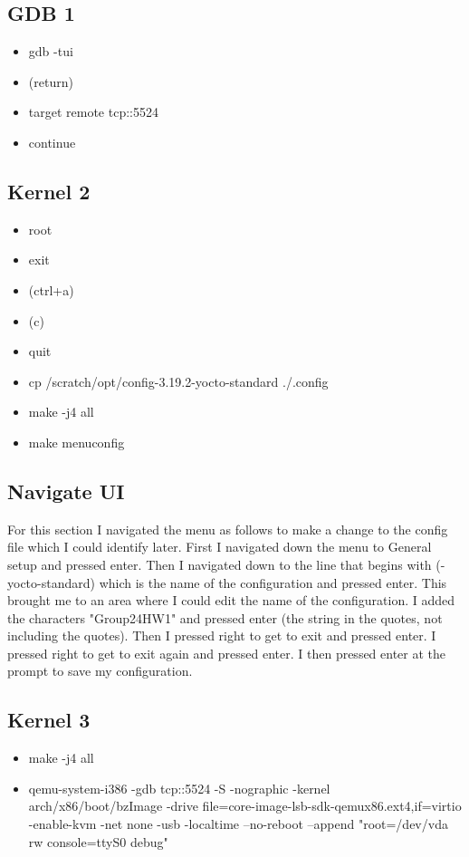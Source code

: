 \documentclass[onecolumn, draftclsnofoot,10pt, compsoc]{IEEEtran}
\begin{document}
    \subsection{GDB 1}
        \begin{itemize}
            \item gdb -tui
            \item (return)
            \item target remote tcp::5524
            \item continue
        \end{itemize}

    \subsection{Kernel 2}
        \begin{itemize}
            \item root
            \item exit
            \item(ctrl+a)
            \item(c)
            \item quit
            \item cp /scratch/opt/config-3.19.2-yocto-standard ./.config
            \item make -j4 all
            \item make menuconfig
        \end{itemize}


    \subsection{Navigate UI}
    For this section I navigated the menu as follows to make a change to the config file which I could identify later. First I navigated down the menu to General setup and pressed enter. Then I navigated down to the line that begins with (-yocto-standard) which is the name of the configuration and pressed enter. This brought me to an area where I could edit the name of the configuration. I added the characters "Group24HW1" and pressed enter (the string in the quotes, not including the quotes). Then I pressed right to get to exit and pressed enter. I pressed right to get to exit again and pressed enter. I then pressed enter at the prompt to save my configuration.
    \subsection{Kernel 3}
        \begin{itemize}
            \item make -j4 all
            \item qemu-system-i386 -gdb tcp::5524 -S -nographic -kernel arch/x86/boot/bzImage -drive file=core-image-lsb-sdk-qemux86.ext4,if=virtio -enable-kvm -net none -usb -localtime --no-reboot --append "root=/dev/vda rw console=ttyS0 debug"
        \end{itemize}
\end{document}

